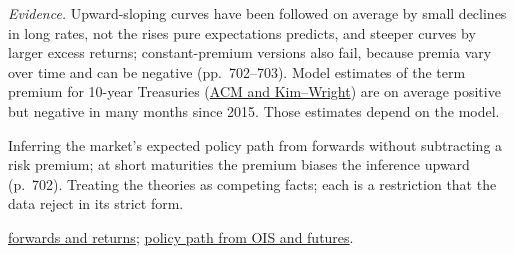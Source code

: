 \begin{qfresult}
 \emph{Evidence.} Upward-sloping curves have been followed on average by small declines in long rates, not the rises pure expectations predicts, and steeper curves by larger excess returns; constant-premium versions also fail, because premia vary over time and can be negative (pp.~702--703). Model estimates of the term premium for 10-year Treasuries (\hyperref[mod:forward-rates-fra]{ACM and Kim--Wright}) are on average positive but negative in many months since 2015. Those estimates depend on the model.

 Inferring the market's expected policy path from forwards without subtracting a risk premium; at short maturities the premium biases the inference upward (p.~702). Treating the theories as competing facts; each is a restriction that the data reject in its strict form.

 \hyperref[meth:forward-rates-expected-returns]{forwards and returns}; \hyperref[meth:policy-path-ois-futures]{policy path from OIS and futures}.

\end{qfresult}

